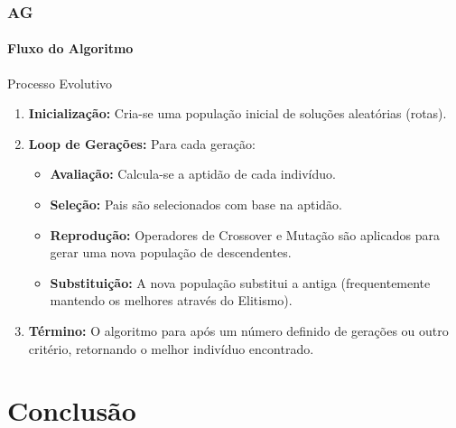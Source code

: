 \documentclass{beamer}
\begin{document}
\begin{frame}
  \frametitle{AG}
  \framesubtitle{Fluxo do Algoritmo}
  
  \begin{block}{Processo Evolutivo}
    \begin{enumerate}
      \item \textbf{Inicialização:} Cria-se uma população inicial de soluções aleatórias (rotas).
      \vspace{0.4cm}
      \item \textbf{Loop de Gerações:} Para cada geração:
      \begin{itemize}
        \item \textbf{Avaliação:} Calcula-se a aptidão de cada indivíduo.
        \item \textbf{Seleção:} Pais são selecionados com base na aptidão.
        \item \textbf{Reprodução:} Operadores de Crossover e Mutação são aplicados para gerar uma nova população de descendentes.
        \item \textbf{Substituição:} A nova população substitui a antiga (frequentemente mantendo os melhores através do Elitismo).
      \end{itemize}
      \vspace{0.4cm}
      \item \textbf{Término:} O algoritmo para após um número definido de gerações ou outro critério, retornando o melhor indivíduo encontrado.
    \end{enumerate}
  \end{block}
  
\end{frame}

\section{Conclusão}
\end{document}

